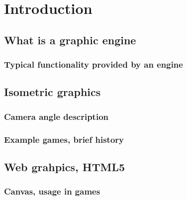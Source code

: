 \documentclass[11pt,oneside, final]{fithesis2}
\begin{document}
  
\FrontMatter  
\ThesisTitlePage  
 
\begin{ThesisDeclaration}  
\DeclarationText  
\AdvisorName  
\end{ThesisDeclaration}  
 
\begin{ThesisThanks}  

\end{ThesisThanks}  
 
\begin{ThesisAbstract}  

\end{ThesisAbstract}  
 
\begin{ThesisKeyWords}  

\end{ThesisKeyWords}  
 
\MainMatter
 
\tableofcontents          %
 
\chapter{Introduction}
\section{What is a graphic engine}
\subsection{Typical functionality provided by an engine}

\section{Isometric graphics}
\subsection{Camera angle description}
\subsection{Example games, brief history}

\section{Web grahpics, HTML5}
\subsection{Canvas, usage in games}
\end{document}
